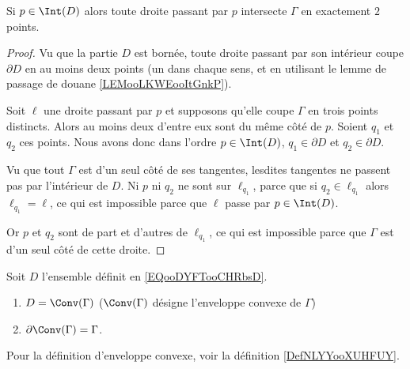 \begin{corollary}       \label{CORooSXDGooJEmVcf}
    Si \( p\in\Int(D)\) alors toute droite passant par \( p\) intersecte \( \Gamma\) en exactement \( 2\) points.
\end{corollary}

\begin{proof}
    Vu que la partie \( D\) est bornée, toute droite passant par son intérieur coupe \( \partial D\) en au moins deux points (un dans chaque sens, et en utilisant le lemme de passage de douane \ref{LEMooLKWEooItGnkP}).

    Soit \( \ell\) une droite passant par \( p\) et supposons qu'elle coupe \( \Gamma\) en trois points distincts. Alors au moins deux d'entre eux sont du même côté de \( p\). Soient \( q_1\) et \( q_2\) ces points. Nous avons donc dans l'ordre \( p\in \Int(D)\), \( q_1\in\partial D\) et \( q_2\in \partial D\). 

    Vu que tout \( \Gamma\) est d'un seul côté de ses tangentes, lesdites tangentes ne passent pas par l'intérieur de \( D\). Ni \( p\) ni \( q_2\) ne sont sur \( \ell_{q_1}\), parce que si \( q_2\in\ell_{q_1}\) alors \( \ell_{q_1}=\ell\), ce qui est impossible parce que \( \ell\) passe par \( p\in\Int(D)\).

    Or \( p\) et \( q_2\) sont de part et d'autres de \( \ell_{q_1}\), ce qui est impossible parce que \( \Gamma\) est d'un seul côté de cette droite.
\end{proof}

\begin{proposition}     \label{PROPooOORPooCXrIQi}
    Soit \( D\) l'ensemble définit en \eqref{EQooDYFTooCHRbsD}.
    \begin{enumerate}
        \item
            \( D=\Conv(\Gamma)\) (\( \Conv(\Gamma)\) désigne l'enveloppe convexe de \( \Gamma\))
        \item
            \( \partial\Conv(\Gamma)=\Gamma\).
    \end{enumerate}
    Pour la définition d'enveloppe convexe, voir la définition \ref{DefNLYYooXUHFUY}.
\end{proposition}

